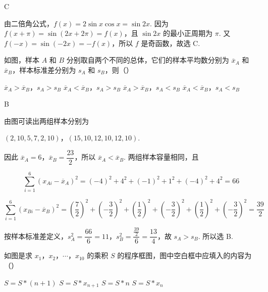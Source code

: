 \begin{answer}
C
\end{answer}

\begin{solution}
由二倍角公式，\(f(x)=2\sin x\cos x=\sin 2x\). 因为 \(f(x+\pi)=\sin(2x+2\pi)=f(x)\)，且 \(\sin 2x\) 的最小正周期为 \(\pi\). 又 \(f(-x)=\sin(-2x)=-f(x)\)，所以 \(f\) 是奇函数，故选 C.
\end{solution}

\begin{problem}
如图，样本 \(A\) 和 \(B\) 分别取自两个不同的总体，它们的样本平均数分别为 \( \overline{x}_{A} \) 和 \( \overline{x}_{B} \)，样本标准差分别为 \( s_{A} \) 和 \( s_{B} \)，则（\quad）


\choices
    {\(\overline{x}_A > \overline{x}_B\)，\(s_A > s_B\)}
    {\(\overline{x}_A < \overline{x}_B\)，\(s_A > s_B\)}
    {\(\overline{x}_A > \overline{x}_B\)，\(s_A < s_B\)}
    {\(\overline{x}_A < \overline{x}_B\)，\(s_A < s_B\)}
\end{problem}

\begin{answer}
B
\end{answer}

\begin{solution}
由图可读出两组样本分别为

\(\left(2,10,5,7,2,10\right)\)，\(\left(15,10,12,10,12,10\right)\).

因此 \(\overline{x}_A=6\)，\(\overline{x}_B=\dfrac{23}{2}\)，所以 \(\overline{x}_A<\overline{x}_B\). 两组样本容量相同，且

\[
\sum_{i=1}^{6}\left(x_{Ai}-\overline{x}_A\right)^2
=(-4)^2+4^2+(-1)^2+1^2+(-4)^2+4^2=66
\]

\[
\sum_{i=1}^{6}\left(x_{Bi}-\overline{x}_B\right)^2
=\left(\frac{7}{2}\right)^2+\left(-\frac{3}{2}\right)^2+\left(\frac{1}{2}\right)^2
+\left(-\frac{3}{2}\right)^2+\left(\frac{1}{2}\right)^2+\left(-\frac{3}{2}\right)^2=\frac{39}{2}
\]

按样本标准差定义，\(s_A^2=\dfrac{66}{6}=11\)，\(s_B^2=\dfrac{\frac{39}{2}}{6}=\dfrac{13}{4}\)，故 \(s_A>s_B\). 所以选 B.
\end{solution}

\begin{problem}
如图是求 \(x_{1}\)，\(x_{2}\)，\(\cdots\)，\(x_{10}\) 的乘积 \(S\) 的程序框图，图中空白框中应填入的内容为（\quad）


\choices
    {\(S = S * (n + 1)\)}
    {\(S = S * x_{n + 1}\)}
    {\(S = S * n\)}
    {\(S = S * x_n\)}
\end{problem}

